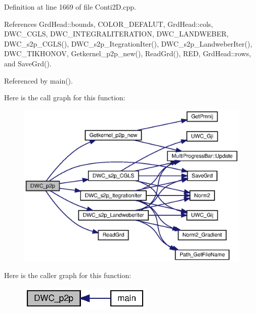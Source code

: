 Definition at line 1669 of file Conti2\+D.\+cpp.



References Grd\+Head\+::bounds, C\+O\+L\+O\+R\+\_\+\+D\+E\+F\+A\+L\+UT, Grd\+Head\+::cols, D\+W\+C\+\_\+\+C\+G\+LS, D\+W\+C\+\_\+\+I\+N\+T\+E\+G\+R\+A\+L\+I\+T\+E\+R\+A\+T\+I\+ON, D\+W\+C\+\_\+\+L\+A\+N\+D\+W\+E\+B\+ER, D\+W\+C\+\_\+s2p\+\_\+\+C\+G\+L\+S(), D\+W\+C\+\_\+s2p\+\_\+\+Itegration\+Iter(), D\+W\+C\+\_\+s2p\+\_\+\+Landweber\+Iter(), D\+W\+C\+\_\+\+T\+I\+K\+H\+O\+N\+OV, Getkernel\+\_\+p2p\+\_\+new(), Read\+Grd(), R\+ED, Grd\+Head\+::rows, and Save\+Grd().



Referenced by main().

Here is the call graph for this function\+:
\nopagebreak
\begin{figure}[H]
\begin{center}
\leavevmode
\includegraphics[width=350pt]{Conti2D_8h_ab87ce573de93575b7ece2e4f772e03fd_ab87ce573de93575b7ece2e4f772e03fd_cgraph}
\end{center}
\end{figure}
Here is the caller graph for this function\+:\nopagebreak
\begin{figure}[H]
\begin{center}
\leavevmode
\includegraphics[width=180pt]{Conti2D_8h_ab87ce573de93575b7ece2e4f772e03fd_ab87ce573de93575b7ece2e4f772e03fd_icgraph}
\end{center}
\end{figure}
\mbox{\label{Conti2D_8h_a68e9e4a8817a29dce16c782fa8213faa_a68e9e4a8817a29dce16c782fa8213faa}} 
